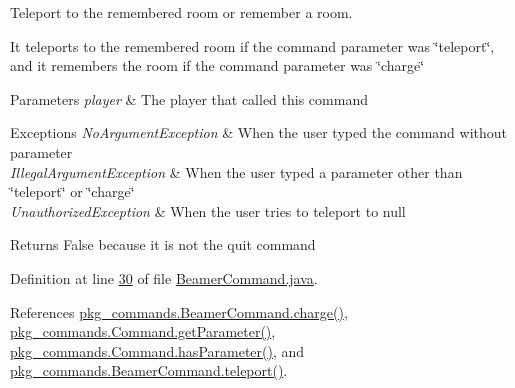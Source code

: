 Teleport to the remembered room or remember a room. 

It teleports to the remembered room if the command parameter was \char`\"{}teleport\char`\"{}, and it remembers the room if the command parameter was \char`\"{}charge\char`\"{} 
\begin{DoxyParams}{Parameters}
{\em player} & The player that called this command \\
\hline
\end{DoxyParams}

\begin{DoxyExceptions}{Exceptions}
{\em No\-Argument\-Exception} & When the user typed the command without parameter \\
\hline
{\em Illegal\-Argument\-Exception} & When the user typed a parameter other than \char`\"{}teleport\char`\"{} or \char`\"{}charge\char`\"{} \\
\hline
{\em Unauthorized\-Exception} & When the user tries to teleport to null \\
\hline
\end{DoxyExceptions}
\begin{DoxyReturn}{Returns}
False because it is not the quit command 
\end{DoxyReturn}


Definition at line \hyperlink{BeamerCommand_8java_source_l00030}{30} of file \hyperlink{BeamerCommand_8java_source}{Beamer\-Command.\-java}.



References \hyperlink{BeamerCommand_8java_source_l00067}{pkg\-\_\-commands.\-Beamer\-Command.\-charge()}, \hyperlink{Command_8java_source_l00041}{pkg\-\_\-commands.\-Command.\-get\-Parameter()}, \hyperlink{Command_8java_source_l00073}{pkg\-\_\-commands.\-Command.\-has\-Parameter()}, and \hyperlink{BeamerCommand_8java_source_l00050}{pkg\-\_\-commands.\-Beamer\-Command.\-teleport()}.



